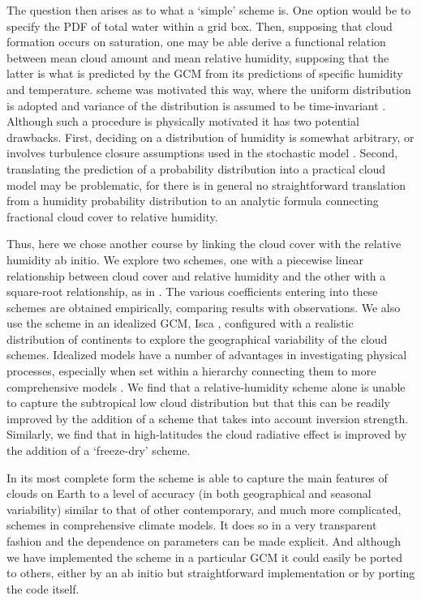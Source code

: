 The question then arises as to what a `simple' scheme is. One option would be to specify the PDF of total water within a grid box. Then, supposing that cloud formation occurs on saturation, one may be able derive a functional relation between mean cloud amount and mean relative humidity, supposing that the latter is what is predicted by the GCM from its predictions of specific humidity and temperature. \citet{Sundqvist1989} scheme was motivated this way, where the uniform distribution is adopted and variance of the distribution is assumed to be time-invariant \citep{Tompkins2005}. Although such a procedure is physically motivated it has two potential drawbacks. First, deciding on a distribution of humidity is somewhat arbitrary, or involves turbulence closure assumptions used in the stochastic model \citep{Sommeria1977,Tsang2018}. Second, translating the prediction of a probability distribution into a practical cloud model may be problematic, for there is in general no straightforward translation from a humidity probability distribution to an analytic formula connecting fractional cloud cover to relative humidity. 

Thus, here we chose another course by linking the cloud cover with the relative humidity ab initio. We explore two schemes, one with a piecewise linear relationship between cloud cover and relative humidity and the other with a square-root relationship, as in \citet{Sundqvist1989}. The various coefficients entering into these schemes are obtained empirically, comparing results with observations. We also use the scheme in an idealized GCM, Isca \citep{Vallis2018}, configured with a realistic distribution of continents to explore the geographical variability of the cloud schemes. Idealized models have a number of advantages in investigating physical processes, especially when set within a hierarchy connecting them to more comprehensive models \citep[e.g.,][]{Maher2018_hierarchies, Thomson2019}. We find that a relative-humidity scheme alone is unable to capture the subtropical low cloud distribution but that this can be readily improved by the addition of a scheme that takes into account inversion strength. Similarly, we find that in high-latitudes the cloud radiative effect is improved by the addition of a `freeze-dry' scheme. 

In its most complete form the scheme is able to capture the main features of clouds on Earth to a level of accuracy (in both geographical and seasonal variability) similar to that of other contemporary, and much more complicated, schemes in comprehensive climate models. It does so in a very transparent fashion and the dependence on parameters can be made explicit. And although we have implemented the scheme in a particular GCM it could easily be ported to others, either by an ab initio but straightforward implementation or by porting the code itself. 

